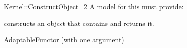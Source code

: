 \begin{ccRefFunctionObjectConcept}{Kernel::ConstructObject_2}
A model for this must provide:


{constructs an object that contains  and returns it.}

\ccRefines
AdaptableFunctor (with one argument)

\ccSeeAlso
{} \\
 \\
 \\
 \\
 \\
  \\

\end{ccRefFunctionObjectConcept}
